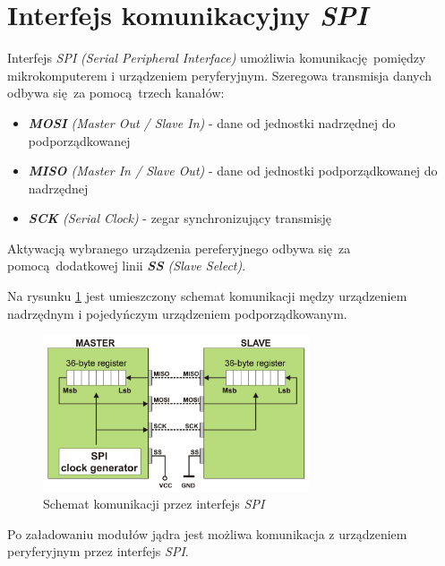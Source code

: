 \documentclass[eng,printmode]{mgr}
\begin{document}
\section{Interfejs komunikacyjny \emph{SPI}}

Interfejs \emph{SPI} \emph{(Serial Peripheral Interface)} umożliwia komunikację pomiędzy mikrokomputerem i urządzeniem peryferyjnym. Szeregowa transmisja danych odbywa się za pomocą trzech kanałów:

\begin{itemize}
  \item{\emph{\textbf{MOSI} (Master Out / Slave In)} - dane od jednostki nadrzędnej do podporządkowanej}
  \item{\emph{\textbf{MISO} (Master In / Slave Out)} - dane od jednostki podporządkowanej do nadrzędnej}
  \item{\emph{\textbf{SCK} (Serial Clock)} - zegar synchronizujący transmisję}
\end{itemize}

Aktywacją wybranego urządzenia pereferyjnego odbywa się za pomocą dodatkowej linii \emph{\textbf{SS} (Slave Select)}.

Na rysunku \ref{spi} jest umieszczony schemat komunikacji mędzy urządzeniem nadrzędnym i pojedyńczym urządzeniem podporządkowanym.

\begin{figure}[!ht]
    \centering
    \includegraphics[width=0.7\textwidth]{Figures/spi3.png} 
    \caption{Schemat komunikacji przez interfejs \emph{SPI}}
    \label{spi}
\end{figure}

Po załadowaniu modułów jądra jest możliwa komunikacja z urządzeniem peryferyjnym przez interfejs \emph{SPI}.



\end{document}
